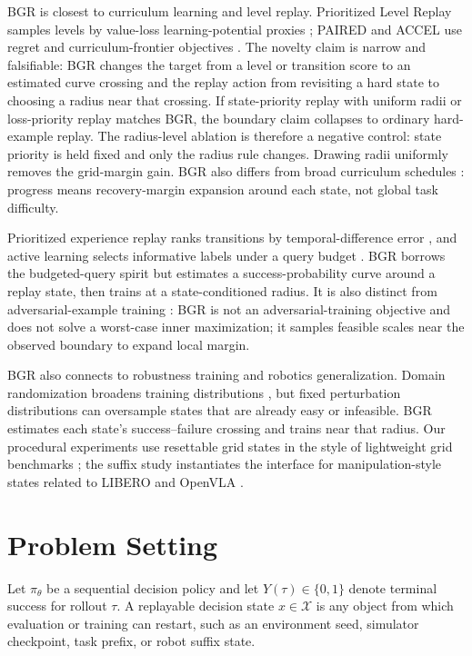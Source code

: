 \documentclass[letterpaper]{article}
\begin{document}
BGR is closest to curriculum learning and level replay. Prioritized Level Replay samples levels by value-loss learning-potential proxies \cite{jiang2021prioritized}; PAIRED and ACCEL use regret and curriculum-frontier objectives \cite{dennis2020paired,parkerholder2022accel}. The novelty claim is narrow and falsifiable: BGR changes the target from a level or transition score to an estimated curve crossing and the replay action from revisiting a hard state to choosing a radius near that crossing. If state-priority replay with uniform radii or loss-priority replay matches BGR, the boundary claim collapses to ordinary hard-example replay. The radius-level ablation is therefore a negative control: state priority is held fixed and only the radius rule changes. Drawing radii uniformly removes the grid-margin gain. BGR also differs from broad curriculum schedules \cite{narvekar2020curriculum}: progress means recovery-margin expansion around each state, not global task difficulty.

Prioritized experience replay ranks transitions by temporal-difference error \cite{schaul2016prioritized}, and active learning selects informative labels under a query budget \cite{settles2009active}. BGR borrows the budgeted-query spirit but estimates a success-probability curve around a replay state, then trains at a state-conditioned radius. It is also distinct from adversarial-example training \cite{goodfellow2015explaining,madry2018towards}: BGR is not an adversarial-training objective and does not solve a worst-case inner maximization; it samples feasible scales near the observed boundary to expand local margin.

BGR also connects to robustness training and robotics generalization. Domain randomization broadens training distributions \cite{tobin2017domain}, but fixed perturbation distributions can oversample states that are already easy or infeasible. BGR estimates each state's success--failure crossing and trains near that radius. Our procedural experiments use resettable grid states in the style of lightweight grid benchmarks \cite{chevalierboisvert2023minigrid}; the suffix study instantiates the interface for manipulation-style states related to LIBERO \cite{liu2023libero} and OpenVLA \cite{kim2024openvla}.

\section{Problem Setting}

Let $\pi_\theta$ be a sequential decision policy and let $Y(\tau)\in\{0,1\}$ denote terminal success for rollout $\tau$. A replayable decision state $x\in\mathcal{X}$ is any object from which evaluation or training can restart, such as an environment seed, simulator checkpoint, task prefix, or robot suffix state.
\end{document}

